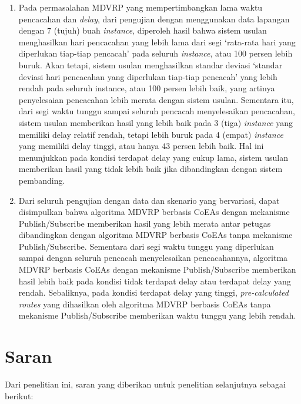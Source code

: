 \begin{enumerate}
	\item Pada permasalahan MDVRP yang mempertimbangkan lama waktu pencacahan dan \textit{delay}, dari pengujian dengan menggunakan data lapangan dengan 7 (tujuh) buah \textit{instance}, diperoleh hasil bahwa sistem usulan menghasilkan hari pencacahan yang lebih lama dari segi `rata-rata hari yang diperlukan tiap-tiap pencacah' pada seluruh \textit{instance}, atau 100 persen lebih buruk. Akan tetapi, sistem usulan menghasilkan standar deviasi `standar deviasi hari pencacahan yang diperlukan tiap-tiap pencacah' yang lebih rendah pada seluruh instance, atau 100 persen lebih baik, yang artinya penyelesaian pencacahan lebih merata dengan sistem usulan. Sementara itu, dari segi waktu tunggu sampai seluruh pencacah menyelesaikan pencacahan, sistem usulan memberikan hasil yang lebih baik pada 3 (tiga) \textit{instance} yang memiliki delay relatif rendah, tetapi lebih buruk pada 4 (empat) \textit{instance} yang memiliki delay tinggi, atau hanya 43 persen lebih baik. Hal ini menunjukkan pada kondisi terdapat delay yang cukup lama, sistem usulan memberikan hasil yang tidak lebih baik jika dibandingkan dengan sistem pembanding.
	
	\item Dari seluruh pengujian dengan data dan skenario yang bervariasi, dapat disimpulkan bahwa algoritma MDVRP berbasis CoEAs dengan mekanisme Publish/Subscribe memberikan hasil yang lebih merata antar petugas dibandingkan dengan algoritma MDVRP berbasis CoEAs tanpa mekanisme Publish/Subscribe. Sementara dari segi waktu tunggu yang diperlukan sampai dengan seluruh pencacah menyelesaikan pencacahannya, algoritma MDVRP berbasis CoEAs dengan mekanisme Publish/Subscribe memberikan hasil lebih baik pada kondisi tidak terdapat delay atau terdapat delay yang rendah. Sebaliknya, pada kondisi terdapat delay yang tinggi, \textit{pre-calculated routes} yang dihasilkan oleh algoritma MDVRP berbasis CoEAs tanpa mekanisme Publish/Subscribe memberikan waktu tunggu yang lebih rendah.
\end{enumerate}


\section{Saran}
Dari penelitian ini, saran yang diberikan untuk penelitian selanjutnya sebagai berikut:

